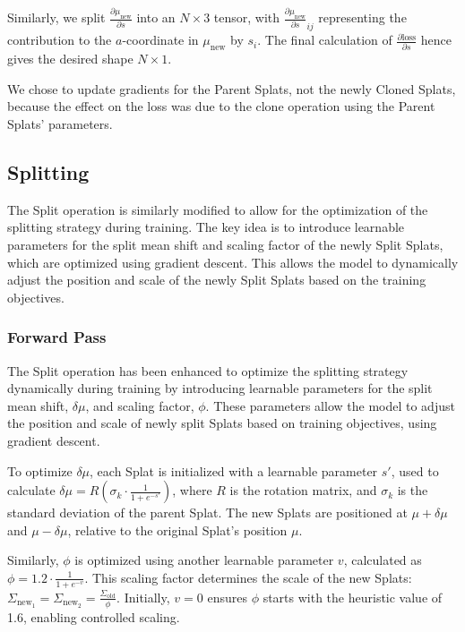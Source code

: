 \documentclass[11pt]{report}
\begin{document}
Similarly, we split $\frac{\partial \mu_{\text{new}}}{\partial s}$ into an $N \times 3$ tensor, with $\frac{\partial \mu_{\text{new}}}{\partial s}_{ij}$ representing the contribution to the $a$-coordinate in $\mu_{\text{new}}$ by $s_{i}$. The final calculation of $\frac{\partial \text{loss}}{\partial s}$ hence gives the desired shape $N \times 1$.

We chose to update gradients for the Parent Splats, not the newly Cloned Splats, because the effect on the loss was due to the clone operation using the Parent Splats' parameters.

\subsection{Splitting}
The Split operation is similarly modified to allow for the optimization of the splitting strategy during training. The key idea is to introduce learnable parameters for the split mean shift and scaling factor of the newly Split Splats, which are optimized using gradient descent. This allows the model to dynamically adjust the position and scale of the newly Split Splats based on the training objectives.

\subsubsection{Forward Pass}
The Split operation has been enhanced to optimize the splitting strategy dynamically during training by introducing learnable parameters for the split mean shift, \(\delta \mu\), and scaling factor, \(\phi\). These parameters allow the model to adjust the position and scale of newly split Splats based on training objectives, using gradient descent.

To optimize \(\delta \mu\), each Splat is initialized with a learnable parameter \(s'\), used to calculate \(\delta \mu = R(\sigma_{k} \cdot \frac{1}{1 + e^{-s'}})\), where \(R\) is the rotation matrix, and \(\sigma_k\) is the standard deviation of the parent Splat. The new Splats are positioned at \(\mu + \delta \mu\) and \(\mu - \delta \mu\), relative to the original Splat’s position \(\mu\).

Similarly, \(\phi\) is optimized using another learnable parameter \(v\), calculated as \(\phi = 1.2 \cdot \frac{1}{1 + e^{-v}}\). This scaling factor determines the scale of the new Splats: \(\Sigma_{\text{new}_1} = \Sigma_{\text{new}_2} = \frac{\Sigma_{\text{old}}}{\phi}\). Initially, \(v = 0\) ensures \(\phi\) starts with the heuristic value of 1.6, enabling controlled scaling.
\end{document}
